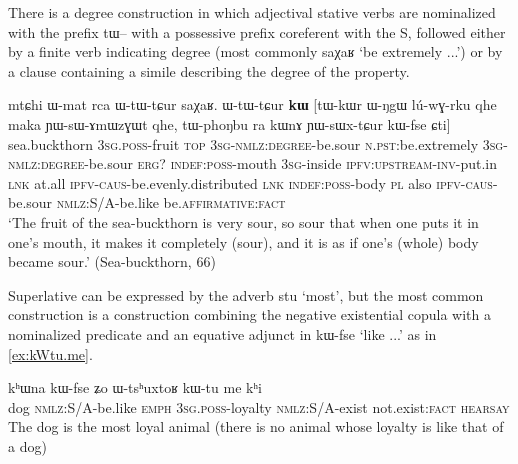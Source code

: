 \documentclass[oldfontcommands,oneside,a4paper,11pt]{article}
\newcommand{\ipa}[1]{{\phon #1}} %
\begin{document}
There is a degree construction in which adjectival stative verbs are nominalized with the prefix \ipa{tɯ--} with a possessive prefix coreferent with the S, followed either by a finite verb indicating degree (most commonly \ipa{saχaʁ} `be extremely ...') or by a clause containing a simile describing the degree of the property.


\begin{exe}
\ex \label{ex:YWsWxtCur}
\gll 
\ipa{mtɕhi}  	\ipa{ɯ-mat}  	\ipa{rca}  	\ipa{ɯ-tɯ-tɕur}  	\ipa{saχaʁ.}  	\ipa{ɯ-tɯ-tɕur}  	\ipa{\textbf{kɯ}}  	[\ipa{tɯ-kɯr}  	\ipa{ɯ-ŋgɯ}  	\ipa{lú-wɣ-rku}  	\ipa{qhe}  	\ipa{maka}  	\ipa{ɲɯ-sɯ-ɤmɯzɣɯt}  	\ipa{qhe,}  	\ipa{tɯ-phoŋbu}  	\ipa{ra}  	\ipa{kɯnɤ}  	\ipa{ɲɯ-sɯx-tɕur}  	\ipa{kɯ-fse}  	\ipa{ɕti}]  \\
sea.buckthorn \textsc{3sg.poss}-fruit \textsc{top} \textsc{3sg-nmlz:degree}-be.sour \textsc{n.pst}:be.extremely \textsc{3sg-nmlz:degree}-be.sour \textsc{erg?} \textsc{indef:poss}-mouth \textsc{3sg}-inside \textsc{ipfv:upstream-inv}-put.in \textsc{lnk} at.all \textsc{ipfv-caus}-be.evenly.distributed \textsc{lnk} \textsc{indef:poss}-body \textsc{pl} also \textsc{ipfv-caus}-be.sour \textsc{nmlz:S/A}-be.like  be.\textsc{affirmative}:\textsc{fact} \\
\glt `The fruit of the sea-buckthorn is very sour, so sour that when one puts it in one's mouth, it makes it completely (sour), and it is as if one's (whole) body became sour.' (Sea-buckthorn, 66)
\end{exe}

Superlative can be expressed by the adverb \ipa{stu} `most', but the most common construction is a construction combining the negative existential copula with a nominalized predicate and an equative adjunct in \ipa{kɯ-fse} `like ...' as in \ref{ex:kWtu.me}.

\begin{exe}
\ex \label{ex:kWtu.me}
\gll 
\ipa{kʰɯna}  	\ipa{kɯ-fse}  	\ipa{ʑo} 	\ipa{ɯ-tsʰuxtoʁ}  	\ipa{kɯ-tu}  	\ipa{me}  	\ipa{kʰi} \\  
dog \textsc{nmlz}:S/A-be.like  \textsc{emph} \textsc{3sg.poss}-loyalty \textsc{nmlz}:S/A-exist  not.exist:\textsc{fact} \textsc{hearsay} \\
\glt The dog is the most loyal animal (there is no animal whose loyalty is like that of a dog)
\end{exe}

%
\end{document}
